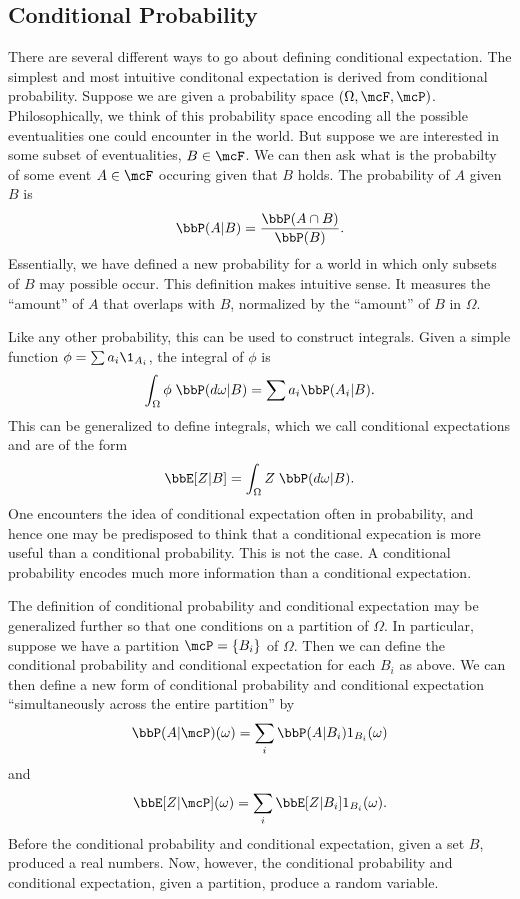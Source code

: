 \documentclass{report}
\begin{document}
\subsection{Conditional Probability}

There are several different ways to go about defining conditional expectation.  The simplest and most intuitive conditonal expectation is derived from conditional probability.  Suppose we are given a probability space $(\Omega, \mcF, \mcP)$.  Philosophically, we think of this probability space encoding all the possible eventualities one could encounter in the world.  But suppose we are interested in some subset of eventualities, $B \in \mcF$.  We can then ask what is the probabilty of some event $A \in \mcF$ occuring given that $B$ holds.  The probability of $A$ given $B$ is
\[
\bbP(A | B) = \frac{\bbP(A \cap B)}{\bbP(B)}.
\]
Essentially, we have defined a new probability for a world in which only subsets of $B$ may possible occur.  This definition makes intuitive sense.  It measures the ``amount'' of $A$ that overlaps with $B$, normalized by the ``amount'' of $B$ in $\Omega$.

Like any other probability, this can be used to construct integrals. Given a simple function $\phi = \sum a_i \1_{A_i}$, the integral of $\phi$ is
\[
\int_\Omega \phi \; \bbP(d\omega|B) = \sum a_i \bbP(A_i | B). 
\]
This can be generalized to define integrals, which we call conditional expectations and are of the form
\[
\bbE[Z|B] = \int_\Omega Z \; \bbP(d \omega | B).
\]
One encounters the idea of conditional expectation often in probability, and hence one may be predisposed to think that a conditional expecation is more useful than a conditional probability.  This is not the case.  A conditional probability encodes much more information than a conditional expectation.

The definition of conditional probability and conditional expectation may be generalized further so that one conditions on a partition of $\Omega$.  In particular, suppose we have a partition $\mcP = \{B_i\}$ of $\Omega$.  Then we can define the conditional probability and conditional expectation for each $B_i$ as above.  We can then define a new form of conditional probability and conditional expectation ``simultaneously across the entire partition'' by
\[
\bbP(A | \mcP)(\omega) = \sum_{i} \bbP(A|B_i) 1_{B_i}(\omega)
\]
and
\[
\bbE[Z | \mcP](\omega) = \sum_{i} \bbE[Z|B_i] 1_{B_i}(\omega).
\]
Before the conditional probability and conditional expectation, given a set $B$, produced a real numbers.  Now, however, the conditional probability and conditional expectation, given a partition, produce a random variable.
\end{document}
